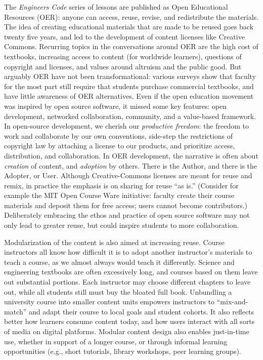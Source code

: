 \documentclass[10pt,journal,compsoc]{IEEEtran}
\begin{document}
The \emph{Engineers Code} series of lessons are published as Open Educational Resources (OER): anyone can access, reuse, revise, and redistribute the materials. 
The idea of creating educational materials that are made to be reused goes back twenty five years, and led to the development of content licenses like Creative Commons. 
Recurring topics in the conversations around OER are the high cost of textbooks, increasing access to content (for worldwide learners), questions of copyright and licenses, and values around altruism and the public good. 
But arguably OER have not been transformational: various surveys show that faculty for the most part still require that students purchase commercial textbooks, and have little awareness of OER alternatives. 
Even if the open education movement was inspired by open source software, it missed some key features: open development, networked collaboration, community, and a value-based framework. 
In open-source development, we cherish our \emph{productive freedom}: the freedom to work and collaborate by our own conventions, side-step the restrictions of copyright law by attaching a license to our products, and prioritize access, distribution, and collaboration. 
In OER development, the narrative is often about \emph{creation} of content, and \emph{adoption} by others. There is the Author, and there is the Adopter, or User. 
Although Creative-Commons licenses are meant for reuse and remix, in practice the emphasis is on sharing for reuse ``as is.'' 
(Consider for example the MIT Open Course Ware initiative: faculty create their course materials and deposit them for free access; users cannot become contributors.) 
Deliberately embracing the ethos and practice of open source software may not only lead to greater reuse, but could inspire students to more collaboration.

Modularization of the content is also aimed at increasing reuse. 
Course instructors all know how difficult it is to adopt another instructor's materials to teach a course, as we almost always would teach it differently. 
Science and engineering textbooks are often excessively long, and courses based on them leave out substantial portions. 
Each instructor may choose different chapters to leave out, while all students still must buy the bloated full book. 
Unbundling a university course into smaller content units empowers instructors to ``mix-and-match'' and adapt their course to local goals and student cohorts. 
It also reflects better how learners consume content today, and how users interact with all sorts of media on digital platforms. 
Modular content design also enables just-in-time use, whether in support of a longer course, or through informal learning opportunities (e.g., short tutorials, library workshops, peer learning groups). 
\end{document}
